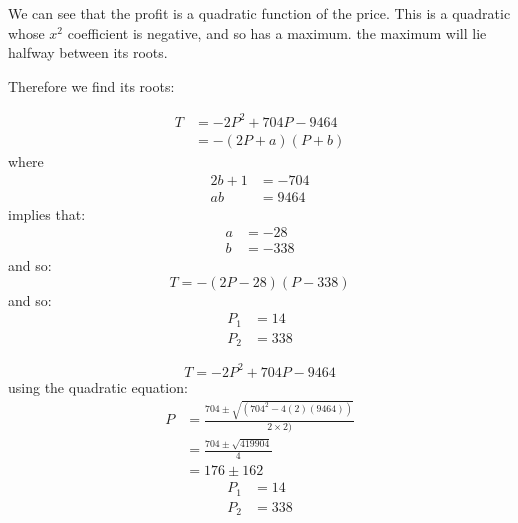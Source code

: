\documentclass[12pt]{article}
\begin{document}
\begin{mdframed}[linewidth=0.5mm, backgroundcolor=orange!10]
We can see that the profit is a quadratic function of the price. This is a quadratic whose $x^2$ coefficient is negative, and so has a maximum. the maximum will lie halfway between its roots.

Therefore we find its roots:
\end{mdframed}

\begin{minipage}[t]{.3\textwidth} %
\begin{mdframed}[linewidth=0.5mm, backgroundcolor=cyan!10]
\vspace{-3mm}
\small{%
\begin{align*}
T &= -2P^2 + 704P - 9464 \\
&= -(2P + a)(P + b)
\end{align*}
where
\begin{align*}
2b + 1 &= -704 \\
ab &= 9464
\end{align*}
implies that:
\begin{align*}
a &= -28 \\
b &= -338
\end{align*}
and so:
\begin{equation*}
T = -(2P - 28)(P-338)
\end{equation*}
and so:
\begin{align*}
P_1 &= 14 \\
P_2 &= 338
\end{align*}
\vspace{-0.55cm}
}
\end{mdframed}
\end{minipage} %
\begin{minipage}[t]{.36\textwidth} %
\begin{mdframed}[linewidth=0.5mm, backgroundcolor=cyan!10]
\vspace{-3mm}
\small{%
\begin{equation*}
T = -2P^2 + 704P - 9464
\end{equation*}
using the quadratic equation:
\begin{align*}
P &= \frac{704 \pm \sqrt{(704^2 - 4(2)(9464))}}{2 \times 2)} \\
&= \frac{704 \pm \sqrt{419904}}{4} \\
&= 176 \pm 162
\end{align*}
\begin{align*}
P_1 &= 14 \\
P_2 &= 338
\end{align*}
\vspace{3cm}
}
\end{mdframed}
\end{minipage} %
\end{document}
